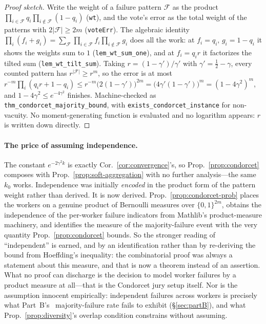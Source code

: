\begin{proof}[Proof sketch]
Write the weight of a failure pattern $\mathcal{F}$ as the product $\prod_{i\in\mathcal{F}}q_i\prod_{i\notin\mathcal{F}}(1-q_i)$ (\texttt{wt}), and the vote's error as the total weight of the patterns with $2|\mathcal{F}|\ge 2m$ (\texttt{voteErr}). The algebraic identity $\prod_i(f_i+g_i)=\sum_{\mathcal{F}}\prod_{i\in\mathcal{F}}f_i\prod_{i\notin\mathcal{F}}g_i$ does all the work: at $f_i=q_i,\,g_i=1-q_i$ it shows the weights sum to $1$ (\texttt{lem\_wt\_sum\_one}), and at $f_i=q_ir$ it factorizes the tilted sum (\texttt{lem\_wt\_tilt\_sum}). Taking $r=(1-\gamma')/\gamma'$ with $\gamma'=\tfrac12-\gamma$, every counted pattern has $r^{|\mathcal{F}|}\ge r^m$, so the error is at most $r^{-m}\prod_i(q_ir+1-q_i)\le r^{-m}\bigl(2(1-\gamma')\bigr)^{2m}=\bigl(4\gamma'(1-\gamma')\bigr)^m=(1-4\gamma^2)^m$, and $1-4\gamma^2\le e^{-4\gamma^2}$ finishes. Machine-checked as \texttt{thm\_condorcet\_majority\_bound}, with \texttt{exists\_condorcet\_instance} for non-vacuity. No moment-generating function is evaluated and no logarithm appears: $r$ is written down directly.
\end{proof}

\paragraph{The price of assuming independence.} The constant $e^{-2\gamma^2k}$ is exactly Cor.~\ref{cor:convergence}'s, so Prop.~\ref{prop:condorcet} composes with Prop.~\ref{prop:soft-aggregation} with no further analysis---the same $k_0$ works. Independence was initially \emph{encoded} in the product form of the pattern weight rather than derived. It is now derived. Prop.~\ref{prop:condorcet-prob} places the workers on a genuine product of Bernoulli measures over $\{0,1\}^{2m}$, obtains the independence of the per-worker failure indicators from Mathlib's product-measure machinery, and identifies the measure of the majority-failure event with the very quantity Prop.~\ref{prop:condorcet} bounds. So the stronger reading of ``independent'' is earned, and by an identification rather than by re-deriving the bound from Hoeffding's inequality: the combinatorial proof was always a statement about this measure, and that is now a theorem instead of an assertion. What no proof can discharge is the decision to model worker failures by a product measure at all---that is the Condorcet jury setup itself. Nor is the assumption innocent empirically: independent failures across workers is precisely what Part~B's \statPBOverlapViolate\ majority-failure rate fails to exhibit (\S\ref{sec:partB}), and what Prop.~\ref{prop:diversity}'s overlap condition constrains without assuming.

